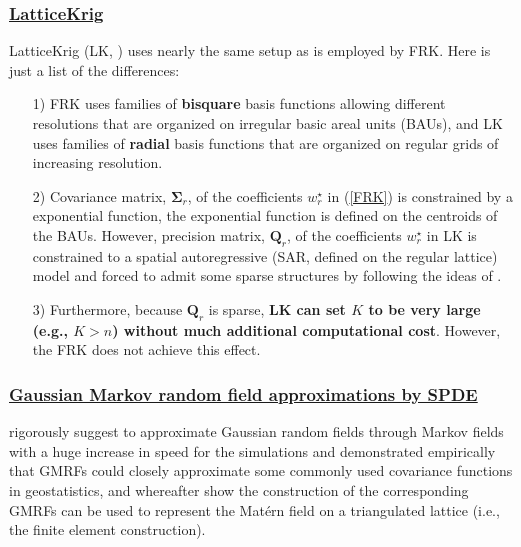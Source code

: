 \documentclass[
12pt, %
a4paper, %
oneside, %
headinclude,footinclude, %
BCOR5mm, %
]{scrartcl}
\begin{document}
\subsubsection{\href{https://chenyw68.github.io/Literature/[2020]LatticeKrigVignette.pdf}{LatticeKrig}}
LatticeKrig (LK, \href{https://chenyw68.github.io/Literature/[2015]A Multiresolution Gaussian Process Model for the Analysis of Large Spatial Datasets.pdf}{\citep{nychka2015multiresolution}}) uses nearly the same setup as is employed by FRK. Here is just a list of the differences:
\begin{itemize}
 \item [1)] FRK uses families of \textbf{bisquare} basis functions allowing different resolutions that are organized on \textcolor[rgb]{0.50,0.50,0.50}{irregular} basic areal units (BAUs), and LK uses families of \textbf{radial} basis functions that are organized on \textcolor[rgb]{0.50,0.50,0.50}{regular} grids of increasing resolution.
 \item [2)] Covariance matrix, $\boldsymbol{\Sigma}_r$, of the coefficients $w_r^{\star}$ in (\ref{FRK}) is constrained by a exponential function, the exponential function is defined on the centroids of the BAUs. However, precision matrix, $\boldsymbol{Q}_r$, of the coefficients $w_r^{\star}$ in LK is constrained to a spatial autoregressive (SAR, defined on the regular lattice) model and forced to admit some sparse structures by following the ideas of \href{https://chenyw68.github.io/Literature/[2011]An explicit link between GF and GMRFs the SPDE approach.pdf}{\citet{lindgren2011explicit}}.
 \item [3)] Furthermore, because $\boldsymbol{Q}_r$ is sparse, \textbf{LK can set $K$ to be very large (e.g.,  $K > n$) without much additional computational cost}. However, the FRK does not achieve this effect.
\end{itemize}

\subsubsection{\href{http://www.r-inla.org/}{Gaussian Markov random field approximations by SPDE}}
\href{https://chenyw68.github.io/Literature/[2005]Gaussian markov random fields theory and applications.pdf}{\citet{rue2005gaussian}} rigorously suggest to approximate \textcolor[rgb]{0.50,0.50,0.50}{Gaussian random fields} through \textcolor[rgb]{0.50,0.50,0.50}{Markov fields} with a huge increase in speed for the simulations and demonstrated empirically that GMRFs could
closely approximate some commonly used covariance functions in geostatistics, and whereafter \href{https://chenyw68.github.io/Literature/[2011]An explicit link between GF and GMRFs the SPDE approach.pdf}{\citet{lindgren2011explicit}} show the construction of the corresponding GMRFs can be used to represent the Matérn field on a triangulated lattice (i.e., the finite element construction).
\end{document}
